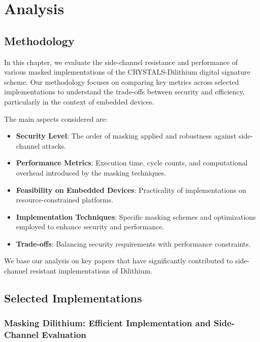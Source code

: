 
\chapter{Analysis}
\thispagestyle{chapterstart}

\section{Methodology}

In this chapter, we evaluate the side-channel resistance and performance of various masked implementations of the CRYSTALS-Dilithium digital signature scheme. Our methodology focuses on comparing key metrics across selected implementations to understand the trade-offs between security and efficiency, particularly in the context of embedded devices.

The main aspects considered are:

\begin{itemize}
    \item \textbf{Security Level}: The order of masking applied and robustness against side-channel attacks.
    \item \textbf{Performance Metrics}: Execution time, cycle counts, and computational overhead introduced by the masking techniques.
    \item \textbf{Feasibility on Embedded Devices}: Practicality of implementations on resource-constrained platforms.
    \item \textbf{Implementation Techniques}: Specific masking schemes and optimizations employed to enhance security and performance.
    \item \textbf{Trade-offs}: Balancing security requirements with performance constraints.
\end{itemize}

We base our analysis on key papers that have significantly contributed to side-channel resistant implementations of Dilithium.

\section{Selected Implementations}

\subsection{Masking Dilithium: Efficient Implementation and Side-Channel Evaluation}

